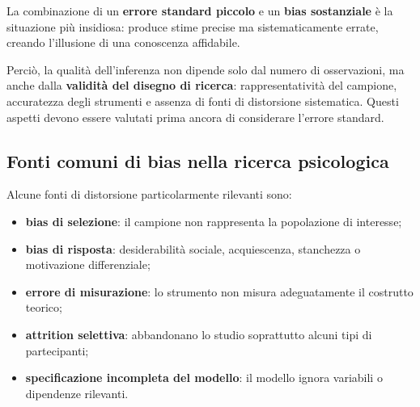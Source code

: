 \documentclass[
  italian,
  letterpaper,
  a4paper,
  11pt,
  open=any]{scrbook}
\providecommand{\tightlist}{%
  \setlength{\itemsep}{0pt}\setlength{\parskip}{0pt}}
\theoremstyle{plain}
\theoremstyle{definition}
\theoremstyle{definition}
\theoremstyle{remark}
\begin{document}
\begin{tcolorbox}[enhanced jigsaw, arc=.35mm, bottomrule=.15mm, bottomtitle=1mm, breakable, colback=white, colbacktitle=quarto-callout-warning-color!10!white, colframe=quarto-callout-warning-color-frame, coltitle=black, left=2mm, leftrule=.75mm, opacityback=0, opacitybacktitle=0.6, rightrule=.15mm, title=\textcolor{quarto-callout-warning-color}{\faExclamationTriangle}\hspace{0.5em}{Il pericolo della falsa precisione}, titlerule=0mm, toprule=.15mm, toptitle=1mm]

La combinazione di un \textbf{errore standard piccolo} e un \textbf{bias
sostanziale} è la situazione più insidiosa: produce stime precise ma
sistematicamente errate, creando l'illusione di una conoscenza
affidabile.

Perciò, la qualità dell'inferenza non dipende solo dal numero di
osservazioni, ma anche dalla \textbf{validità del disegno di ricerca}:
rappresentatività del campione, accuratezza degli strumenti e assenza di
fonti di distorsione sistematica. Questi aspetti devono essere valutati
prima ancora di considerare l'errore standard.

\end{tcolorbox}

\subsection{Fonti comuni di bias nella ricerca
psicologica}\label{fonti-comuni-di-bias-nella-ricerca-psicologica}

Alcune fonti di distorsione particolarmente rilevanti sono:

\begin{itemize}
\tightlist
\item
  \textbf{bias di selezione}: il campione non rappresenta la popolazione
  di interesse;
\item
  \textbf{bias di risposta}: desiderabilità sociale, acquiescenza,
  stanchezza o motivazione differenziale;
\item
  \textbf{errore di misurazione}: lo strumento non misura adeguatamente
  il costrutto teorico;
\item
  \textbf{attrition selettiva}: abbandonano lo studio soprattutto alcuni
  tipi di partecipanti;
\item
  \textbf{specificazione incompleta del modello}: il modello ignora
  variabili o dipendenze rilevanti.
\end{itemize}
\end{document}
